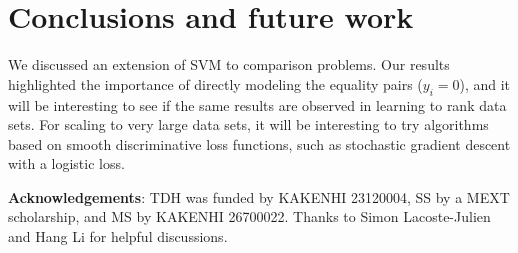 \documentclass{article}
\begin{document}
\section{Conclusions and future work}
\label{sec:conclusions}

We discussed an extension of SVM to comparison problems. Our results
highlighted the importance of directly modeling the equality pairs
($y_i=0$), and it will be interesting to see if the same results are
observed in learning to rank data sets. For scaling to very large data
sets, it will be interesting to try algorithms based on smooth
discriminative loss functions, such as stochastic gradient descent
with a logistic loss.

\textbf{Acknowledgements}: TDH was funded by KAKENHI 23120004, SS by a
MEXT scholarship, and MS by KAKENHI 26700022. Thanks to Simon
Lacoste-Julien and Hang Li for helpful discussions.



\end{document}
